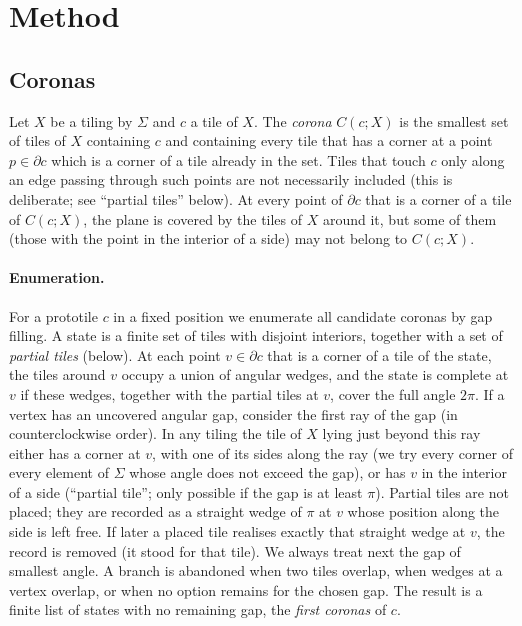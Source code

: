 \documentclass[11pt]{article}
\theoremstyle{remark}
\begin{document}
\section{Method}\label{sec:method}

\subsection{Coronas}

Let $X$ be a tiling by $\Sigma$ and $c$ a tile of $X$. The \emph{corona} $C(c;X)$ is the smallest set of tiles of $X$ containing $c$ and containing every tile that has a corner at a point $p\in\partial c$ which is a corner of a tile already in the set. Tiles that touch $c$ only along an edge passing through such points are not necessarily included (this is deliberate; see ``partial tiles'' below). At every point of $\partial c$ that is a corner of a tile of $C(c;X)$, the plane is covered by the tiles of $X$ around it, but some of them (those with the point in the interior of a side) may not belong to $C(c;X)$.

\paragraph{Enumeration.} For a prototile $c$ in a fixed position we enumerate all candidate coronas by gap filling. A state is a finite set of tiles with disjoint interiors, together with a set of \emph{partial tiles} (below). At each point $v\in\partial c$ that is a corner of a tile of the state, the tiles around $v$ occupy a union of angular wedges, and the state is complete at $v$ if these wedges, together with the partial tiles at $v$, cover the full angle $2\pi$. If a vertex has an uncovered angular gap, consider the first ray of the gap (in counterclockwise order). In any tiling the tile of $X$ lying just beyond this ray either has a corner at $v$, with one of its sides along the ray (we try every corner of every element of $\Sigma$ whose angle does not exceed the gap), or has $v$ in the interior of a side (``partial tile''; only possible if the gap is at least $\pi$). Partial tiles are not placed; they are recorded as a straight wedge of $\pi$ at $v$ whose position along the side is left free. If later a placed tile realises exactly that straight wedge at $v$, the record is removed (it stood for that tile). We always treat next the gap of smallest angle. A branch is abandoned when two tiles overlap, when wedges at a vertex overlap, or when no option remains for the chosen gap. The result is a finite list of states with no remaining gap, the \emph{first coronas} of $c$.
\end{document}
